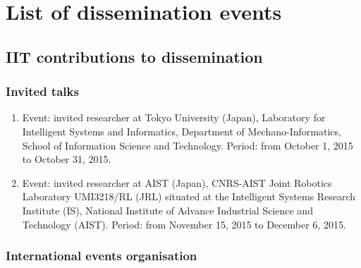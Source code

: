 \appendix
\section{List of dissemination events}

\subsection{IIT contributions to dissemination}

\subsubsection{Invited talks}

\begin{enumerate}
\item  Event: invited researcher at Tokyo University (Japan), Laboratory for Intelligent Systems and Informatics, Department of Mechano-Informatics, School of Information Science and Technology. Period: from October 1, 2015 to October 31, 2015.
\item  Event: invited researcher at AIST (Japan), CNRS-AIST Joint Robotics Laboratory UMI3218/RL (JRL) situated at the Intelligent Systems Research Institute (IS), National Institute of Advance Industrial Science and Technology (AIST). Period: from November 15, 2015 to December 6, 2015.
\end{enumerate}

\subsubsection{International events organisation}

